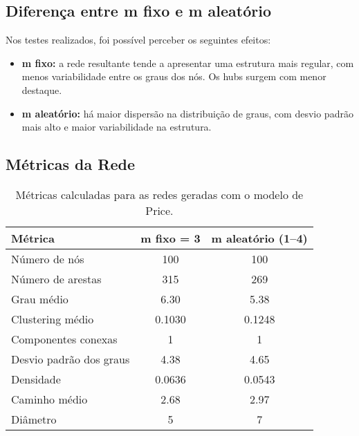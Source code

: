 \documentclass{article}
\begin{document}
\subsection*{Diferença entre m fixo e m aleatório}

Nos testes realizados, foi possível perceber os seguintes efeitos:

\begin{itemize}
    \item \textbf{m fixo:} a rede resultante tende a apresentar uma estrutura mais regular, com menos variabilidade entre os graus dos nós. Os hubs surgem com menor destaque.
    \item \textbf{m aleatório:} há maior dispersão na distribuição de graus, com desvio padrão mais alto e maior variabilidade na estrutura.
\end{itemize}

\subsection*{Métricas da Rede}

\begin{table}[h]
\centering
\begin{tabular}{|l|c|c|}
\hline
\textbf{Métrica} & \textbf{m fixo = 3} & \textbf{m aleatório (1–4)} \\
\hline
Número de nós & 100 & 100 \\
Número de arestas & 315 & 269 \\
Grau médio & 6.30 & 5.38 \\
Clustering médio & 0.1030 & 0.1248 \\
Componentes conexas & 1 & 1 \\
Desvio padrão dos graus & 4.38 & 4.65 \\
Densidade & 0.0636 & 0.0543 \\
Caminho médio & 2.68 & 2.97 \\
Diâmetro & 5 & 7 \\
\hline
\end{tabular}
\caption{Métricas calculadas para as redes geradas com o modelo de Price.}
\end{table}
\end{document}
